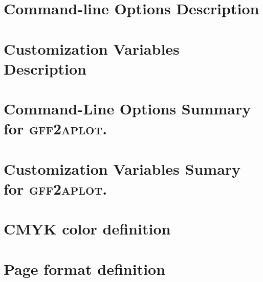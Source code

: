 \documentclass[11pt]{article}
\newcommand{\sctn}[1]{\section{#1}}
\def\prog{\textsc{\textbf{gff2aplot}}}
\begin{document}
\tableofcontents

\listoffigures

\listoftables


\newpage
{}
\setcounter{page}{1}

%
% 

%
% 

%
% 

%
% 

%
% 

%
% 


\sctn{Command-line Options Description}




\newpage

\sctn{Customization Variables Description}




% 
% 
% 

\appendix

\newpage

\sctn{Command-Line Options Summary for \prog.}



\newpage

\sctn{Customization Variables Sumary for \prog.}



\newpage

\sctn{CMYK color definition}



\newpage

\sctn{Page format definition}


\end{document}
